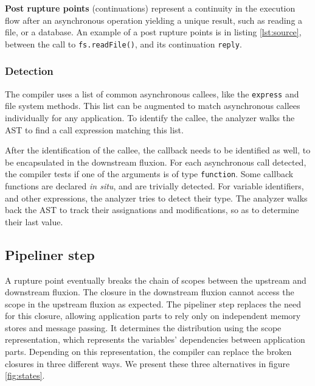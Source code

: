 \textbf{Post rupture points} (continuations) represent a continuity in the execution flow after an asynchronous operation yielding a unique result, such as reading a file, or a database.
An example of a post rupture points is in listing \ref{lst:source}, between the call to \texttt{fs.readFile()}, and its continuation \texttt{reply}.

\subsubsection{Detection}

The compiler uses a list of common asynchronous callees, like the \texttt{express} and file system methods.
This list can be augmented to match asynchronous callees individually for any application.
To identify the callee, the analyzer walks the AST to find a call expression matching this list.

After the identification of the callee, the callback needs to be identified as well, to be encapsulated in the downstream fluxion.
For each asynchronous call detected, the compiler tests if one of the arguments is of type \texttt{function}.
Some callback functions are declared \textit{in situ}, and are trivially detected.
For variable identifiers, and other expressions, the analyzer tries to detect their type.
The analyzer walks back the AST to track their assignations and modifications, so as to determine their last value.

\subsection{Pipeliner step} \label{section:compiler:pipeliner}

A rupture point eventually breaks the chain of scopes between the upstream and downstream fluxion.
The closure in the downstream fluxion cannot access the scope in the upstream fluxion as expected.
The pipeliner step replaces the need for this closure, allowing application parts to rely only on independent memory stores and message passing.
It determines the distribution using the scope representation, which represents the variables' dependencies between application parts.
Depending on this representation, the compiler can replace the broken closures in three different ways.
We present these three alternatives in figure \ref{fig:states}.

